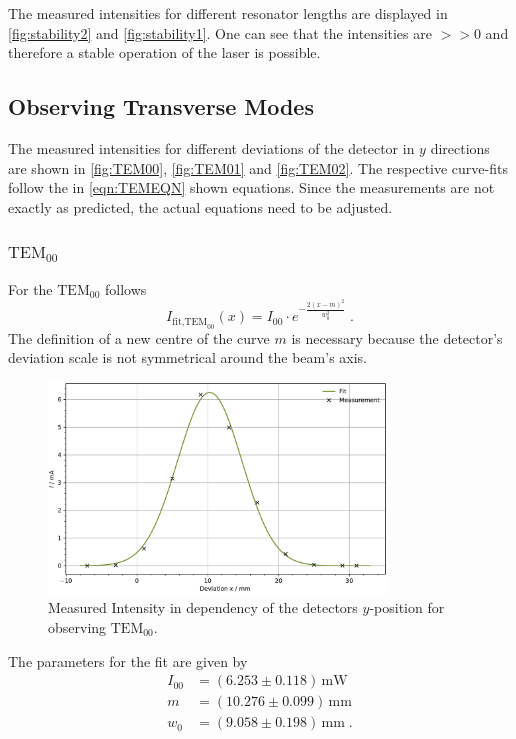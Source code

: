 The measured intensities for different resonator lengths are displayed in \autoref{fig:stability2} and \autoref{fig:stability1}. One can see that the intensities are $>>0$ and therefore a stable operation of the laser is possible.

\subsection{Observing Transverse Modes}

The measured intensities for different deviations of the detector in $y$ directions are shown in \autoref{fig:TEM00}, \autoref{fig:TEM01} and \autoref{fig:TEM02}. The respective curve-fits follow the in \autoref{eqn:TEMEQN} shown equations. Since the measurements are not exactly as 
predicted, the actual equations need to be adjusted.

\subsubsection{$\text{TEM}_{00}$}

For the $\text{TEM}_{00}$ follows 
\begin{equation*}
    I_{\text{fit,TEM}_{00}}(x) = I_{00} \cdot e^{-\frac{2 (x - m)^2}{w_0^2}}\; .
\end{equation*}
The definition of a new centre of the curve $m$ is necessary because the detector's deviation scale is not symmetrical around the beam's axis.
\begin{figure}
	\centering
	\includegraphics[width=0.8\textwidth]{content/plots/TEM00.pdf}
	\caption{Measured Intensity in dependency of the detectors $y$-position for observing $\text{TEM}_{00}$.}
	\label{fig:TEM00}
\end{figure}
The parameters for the fit are given by
\begin{align*}
    I_{00} &= (6.253\pm 0.118) \, \unit{\milli \watt}\\
    m &= (10.276\pm 0.099)\, \unit{\milli \meter}\\
    w_0 &= (9.058\pm 0.198) \, \unit{\milli \meter}\; .
\end{align*}

